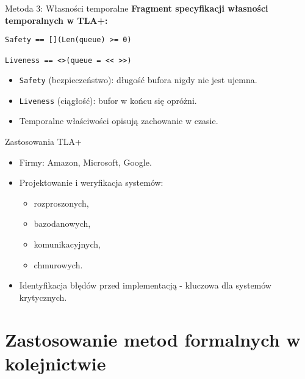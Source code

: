 \documentclass{beamer}
\begin{document}
\begin{frame}[fragile]{Metoda 3: Własności temporalne}
  \textbf{Fragment specyfikacji własności temporalnych w TLA+:}
  \vspace{0.5em}
  \begin{verbatim}
Safety == [](Len(queue) >= 0)

Liveness == <>(queue = << >>)
  \end{verbatim}

  \vspace{0.1em}
  \begin{itemize}
    \item \texttt{Safety} (bezpieczeństwo): długość bufora nigdy nie jest ujemna.
    \item \texttt{Liveness} (ciągłość): bufor w końcu się opróżni.
    \item Temporalne właściwości opisują zachowanie w czasie.
  \end{itemize}
\end{frame}

\begin{frame}{Zastosowania TLA+}
  \begin{itemize}
      \item Firmy: Amazon, Microsoft, Google.
      \item Projektowanie i weryfikacja systemów:
      \begin{itemize}
          \item rozproszonych,
          \item bazodanowych,
          \item komunikacyjnych,
          \item chmurowych.
      \end{itemize}
      \item Identyfikacja błędów przed implementacją - kluczowa dla systemów krytycznych.
  \end{itemize}
\end{frame}

\section{Zastosowanie metod formalnych w kolejnictwie}
\end{document}
